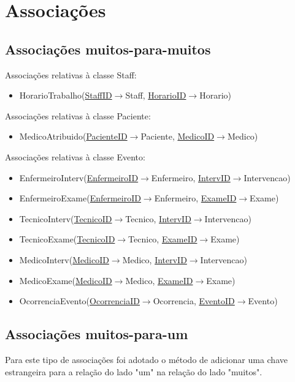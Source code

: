\documentclass[article, a4paper, 12pt, oneside]{memoir}
\begin{document}
\section{Associações}
\subsection{Associações muitos-para-muitos}
Associações relativas à classe Staff:
\begin{itemize}
	\item HorarioTrabalho(\underline{StaffID}$\rightarrow$Staff, \underline{HorarioID}$\rightarrow$Horario)
\end{itemize}

Associações relativas à classe Paciente:
\begin{itemize}
	\item MedicoAtribuido(\underline{PacienteID}$\rightarrow$Paciente, \underline{MedicoID}$\rightarrow$Medico)
\end{itemize}

Associações relativas à classe Evento:
\begin{itemize}
	\item EnfermeiroInterv(\underline{EnfermeiroID}$\rightarrow$Enfermeiro, \underline{IntervID}$\rightarrow$Intervencao)
	\item EnfermeiroExame(\underline{EnfermeiroID}$\rightarrow$Enfermeiro, \underline{ExameID}$\rightarrow$Exame)
	\item TecnicoInterv(\underline{TecnicoID}$\rightarrow$Tecnico, \underline{IntervID}$\rightarrow$Intervencao)
	\item TecnicoExame(\underline{TecnicoID}$\rightarrow$Tecnico, \underline{ExameID}$\rightarrow$Exame)
	\item MedicoInterv(\underline{MedicoID}$\rightarrow$Medico, \underline{IntervID}$\rightarrow$Intervencao)
	\item MedicoExame(\underline{MedicoID}$\rightarrow$Medico, \underline{ExameID}$\rightarrow$Exame)
	\item OcorrenciaEvento(\underline{OcorrenciaID}$\rightarrow$Ocorrencia, \underline{EventoID}$\rightarrow$Evento)
\end{itemize}

\subsection{Associações muitos-para-um}
Para este tipo de associações foi adotado o método de adicionar uma chave estrangeira para a relação do lado "um" na relação do lado "muitos".
\end{document}
